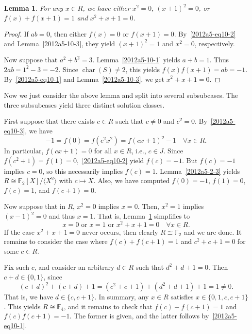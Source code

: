 \documentclass{article}
\newcommand{\F}{\mathbb{F}}
\DeclareMathOperator{\rchar}{char}
\newtheorem{lemma}{Lemma}
\begin{document}
\begin{lemma}\label{2012a5-10-4}
For any $x \in R$, we have either $x^2 = 0$, $(x + 1)^2 = 0$, or $f(x) + f(x + 1) = 1$ and $x^2 + x + 1 = 0$.
\end{lemma}
\begin{proof}

If $ab = 0$, then either $f(x) = 0$ or $f(x + 1) = 0$.
By~\eqref{2012a5-eq10-2} and Lemma~\ref{2012a5-10-3}, they yield $(x + 1)^2 = 1$ and $x^2 = 0$, respectively.

Now suppose that $a^2 + b^2 = 3$.
Lemma~\ref{2012a5-10-1} yields $a + b = 1$.
Thus $2ab = 1^2 - 3 = -2$.
Since $\rchar(S) \neq 2$, this yields $f(x) f(x + 1) = ab = -1$.
By~\eqref{2012a5-eq10-1} and Lemma~\ref{2012a5-10-3}, we get $x^2 + x + 1 = 0$.
\end{proof}

Now we just consider the above lemma and split into several subsubcases.
The three subsubcases yield three distinct solution classes.

First suppose that there exists $c \in R$ such that $c \neq 0$ and $c^2 = 0$.
By~\eqref{2012a5-eq10-3}, we have
\[ -1 = f(0) = f(c^2 x^2) = f(cx + 1)^2 - 1 \quad \forall x \in R. \]
In particular, $f(cx + 1) = 0$ for all $x \in R$, i.e., $c \in J$.
Since $f(c^2 + 1) = f(1) = 0$,~\eqref{2012a5-eq10-2} yield $f(c) = -1$.
But $f(c) = -1$ implies $c = 0$, so this necessarily implies $f(c) = 1$.
Lemma~\ref{2012a5-2-3} yields $R \cong \F_2[X]/\langle X^2 \rangle$ with $c \mapsto X$.
Also, we have computed $f(0) = -1$, $f(1) = 0$, $f(c) = 1$, and $f(c + 1) = 0$.

Now suppose that in $R$, $x^2 = 0$ implies $x = 0$.
Then, $x^2 = 1$ implies $(x - 1)^2 = 0$ and thus $x = 1$.
That is, Lemma~\ref{2012a5-10-4} simplifies to
\[ x = 0 \text{ or } x = 1 \text{ or } x^2 + x + 1 = 0 \quad \forall x \in R. \]
If the case $x^2 + x + 1 = 0$ never occurs, then clearly $R \cong \F_2$ and we are done.
It remains to consider the case where $f(c) + f(c + 1) = 1$ and $c^2 + c + 1 = 0$ for some $c \in R$.

Fix such $c$, and consider an arbitrary $d \in R$ such that $d^2 + d + 1 = 0$.
Then $c + d \in \{0, 1\}$, since
\[ (c + d)^2 + (c + d) + 1 = (c^2 + c + 1) + (d^2 + d + 1) + 1 = 1 \neq 0. \]
That is, we have $d \in \{c, c + 1\}$.
In summary, any $x \in R$ satisfies $x \in \{0, 1, c, c + 1\}$.
This yields $R \cong \F_4$, and it remains to check that $f(c) + f(c + 1) = 1$ and $f(c) f(c + 1) = -1$.
The former is given, and the latter follows by~\eqref{2012a5-eq10-1}.
\end{document}
